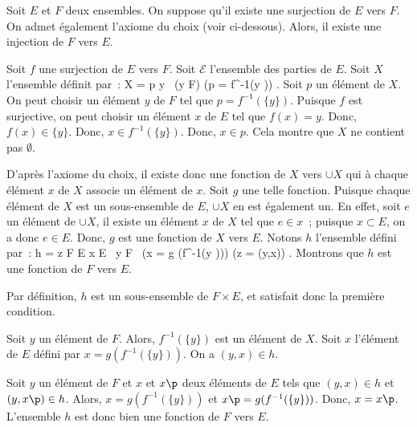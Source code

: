 \done

\blank[medium]

\noindent{} 
Soit $E$ et $F$ deux ensembles. 
On suppose qu'il existe une surjection de $E$ vers $F$. 
On admet également l'axiome du choix (voir ci-dessous). 
Alors, il existe une injection de $F$ vers $E$. 

\blank[medium]

\noindent{} 
    Soit $f$ une surjection de $E$ vers $F$.
    Soit $\mathcal{E}$ l'ensemble des parties de $E$. 
    Soit $X$ l'ensemble définit par : 
    \startformula
        X = \lbrace
                p \in {} \vert
                \exists y \, (y \in F) \wedge (p = f^{-1}(\lbrace y \rbrace))
            \rbrace .
    \stopformula
    Soit $p$ un élément de $X$.
    On peut choisir un élément $y$ de $F$ tel que $p = f^{-1}(\lbrace y \rbrace)$.
    Puisque $f$ est surjective, on peut choisir un élément $x$ de $E$ tel que $f(x) = y$.
    Donc, $f(x) \in \lbrace y \rbrace$.
    Donc, $x \in f^{-1}(\lbrace y \rbrace)$.
    Donc, $x \in p$.
    Cela montre que $X$ ne contient pas $\emptyset$.

    D'après l'axiome du choix, il existe donc une fonction de $X$ vers $\cup X$ qui à chaque élément $x$ de $X$ associe un élément de $x$. 
    Soit $g$ une telle fonction.
    Puisque chaque élément de $X$ est un sous-ensemble de $E$, $\cup X$ en est également un. 
    En effet, soit $e$ un élément de $\cup X$, il existe un élément $x$ de $X$ tel que $e \in x$ ; puisque $x \subset E$, on a donc $e \in E$.
    Donc, $g$ est une fonction de $X$ vers $E$.
    Notons $h$ l'ensemble défini par :
    \startformula
        h = \lbrace 
                z \in F \times E \vert
                \exists x \in E \, \exists y \in F \, 
                (x = g (f^{-1}(\lbrace y \rbrace))) \wedge (z = (y,x))
            \rbrace.
    \stopformula
    Montrons que $h$ est une fonction de $F$ vers $E$.
    \startitemize[nowhite]
        \item Par définition, $h$ est un sous-ensemble de $F \times E$, et satisfait donc la première condition.
        \item Soit $y$ un élément de $F$. 
            Alors, $f^{-1}(\lbrace y \rbrace)$ est un élément de $X$.
            Soit $x$ l'élément de $E$ défini par $x = g(f^{-1}(\lbrace y \rbrace))$.
            On a $(y,x) \in h$.
        \item Soit $y$ un élément de $F$ et $x$ et $x\p$ deux éléments de $E$ tels que $(y,x) \in h$ et $(y,x\p) \in h$.
            Alors, $x = g (f^{-1}(\lbrace y \rbrace))$ et $x\p = g (f^{-1}(\lbrace y \rbrace))$.
            Donc, $x = x\p$.
    \stopitemize
    L'ensemble $h$ est donc bien une fonction de $F$ vers $E$.

